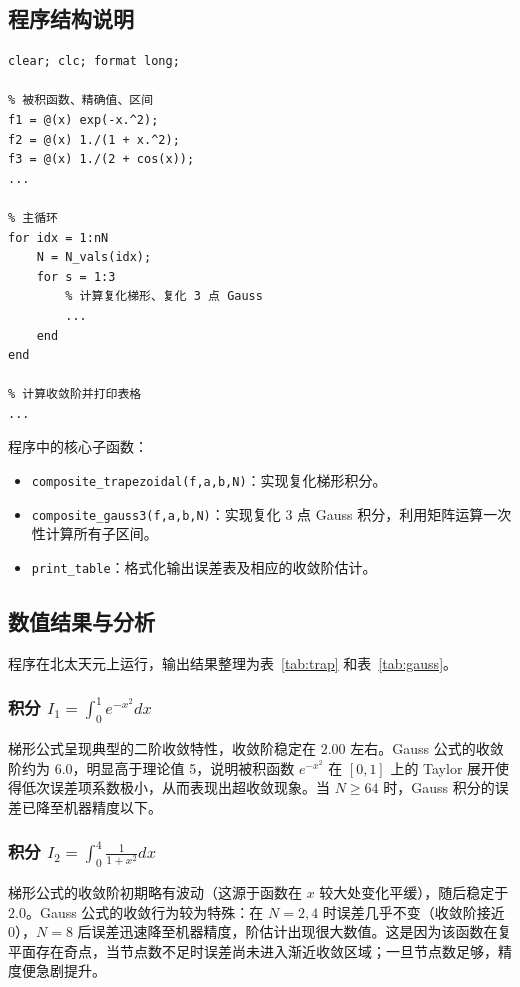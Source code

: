 \documentclass[12pt,a4paper]{article}
\begin{document}
\subsection{程序结构说明}

\begin{lstlisting}[caption={hw7\_2.m 程序结构}, label={lst:hw7code}]
clear; clc; format long;

% 被积函数、精确值、区间
f1 = @(x) exp(-x.^2);
f2 = @(x) 1./(1 + x.^2);
f3 = @(x) 1./(2 + cos(x));
...

% 主循环
for idx = 1:nN
    N = N_vals(idx);
    for s = 1:3
        % 计算复化梯形、复化 3 点 Gauss
        ...
    end
end

% 计算收敛阶并打印表格
...
\end{lstlisting}

程序中的核心子函数：
\begin{itemize}
    \item \texttt{composite\_trapezoidal(f,a,b,N)}：实现复化梯形积分。
    \item \texttt{composite\_gauss3(f,a,b,N)}：实现复化 3 点 Gauss 积分，利用矩阵运算一次性计算所有子区间。
    \item \texttt{print\_table}：格式化输出误差表及相应的收敛阶估计。
\end{itemize}

\subsection{数值结果与分析}

程序在北太天元上运行，输出结果整理为表~\ref{tab:trap} 和表~\ref{tab:gauss}。

\subsubsection{积分 \(I_1=\int_0^1 e^{-x^2}dx\)}
梯形公式呈现典型的二阶收敛特性，收敛阶稳定在 \(2.00\) 左右。Gauss 公式的收敛阶约为 \(6.0\)，明显高于理论值 5，说明被积函数 \(e^{-x^2}\) 在 \([0,1]\) 上的 Taylor 展开使得低次误差项系数极小，从而表现出超收敛现象。当 \(N\ge 64\) 时，Gauss 积分的误差已降至机器精度以下。

\subsubsection{积分 \(I_2=\int_0^4 \frac{1}{1+x^2}dx\)}
梯形公式的收敛阶初期略有波动（这源于函数在 \(x\) 较大处变化平缓），随后稳定于 \(2.0\)。Gauss 公式的收敛行为较为特殊：在 \(N=2,4\) 时误差几乎不变（收敛阶接近 0），\(N=8\) 后误差迅速降至机器精度，阶估计出现很大数值。这是因为该函数在复平面存在奇点，当节点数不足时误差尚未进入渐近收敛区域；一旦节点数足够，精度便急剧提升。
\end{document}
